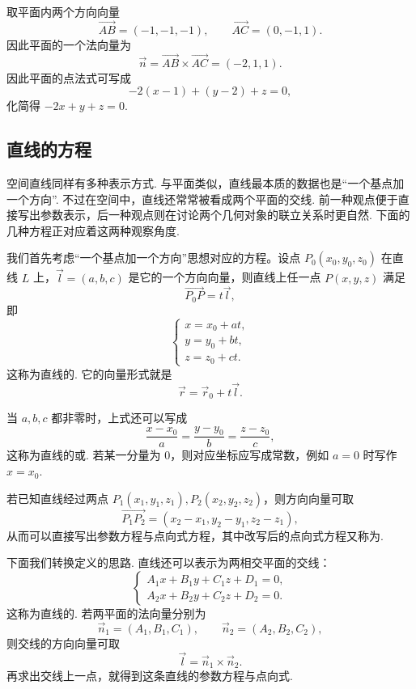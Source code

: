 \begin{solution}
    取平面内两个方向向量
    \[
        \overrightarrow{AB} = (-1, -1, -1), \qquad \overrightarrow{AC} = (0, -1, 1).
    \]
    因此平面的一个法向量为
    \[
        \vec{n} = \overrightarrow{AB}\times\overrightarrow{AC} = (-2, 1, 1).
    \]
    因此平面的点法式可写成
    \[
        -2(x - 1) + (y - 2) + z = 0,
    \]
    化简得 $-2x + y + z = 0$.
\end{solution}

\subsection{直线的方程}

空间直线同样有多种表示方式. 与平面类似，直线最本质的数据也是``一个基点加一个方向''. 不过在空间中，直线还常常被看成两个平面的交线. 前一种观点便于直接写出参数表示，后一种观点则在讨论两个几何对象的联立关系时更自然. 下面的几种方程正对应着这两种观察角度.

我们首先考虑``一个基点加一个方向''思想对应的方程。设点 $P_0(x_0, y_0, z_0)$ 在直线 $L$ 上，$\vec{l} = (a, b, c)$ 是它的一个方向向量，则直线上任一点 $P(x, y, z)$ 满足
\[
    \overrightarrow{P_0P} = t \vec{l},
\]
即
\[
    \begin{cases}
        x = x_0 + a t, \\
        y = y_0 + b t, \\
        z = z_0 + c t.
    \end{cases}
\]
这称为直线的. 它的向量形式就是
\[
    \vec{r} = \vec{r}_0 + t \vec{l}.
\]

当 $a, b, c$ 都非零时，上式还可以写成
\[
    \frac{x - x_0}{a} = \frac{y - y_0}{b} = \frac{z - z_0}{c},
\]
这称为直线的或. 若某一分量为 $0$，则对应坐标应写成常数，例如 $a = 0$ 时写作 $x = x_0$.

若已知直线经过两点 $P_1(x_1, y_1, z_1), P_2(x_2, y_2, z_2)$，则方向向量可取
\[
    \overrightarrow{P_1P_2} = (x_2 - x_1, y_2 - y_1, z_2 - z_1),
\]
从而可以直接写出参数方程与点向式方程，其中改写后的点向式方程又称为.

下面我们转换定义的思路. 直线还可以表示为两相交平面的交线：
\[
    \begin{cases}
        A_1 x + B_1 y + C_1 z + D_1 = 0, \\
        A_2 x + B_2 y + C_2 z + D_2 = 0.
    \end{cases}
\]
这称为直线的. 若两平面的法向量分别为
\[
    \vec{n}_1 = (A_1, B_1, C_1), \qquad \vec{n}_2 = (A_2, B_2, C_2),
\]
则交线的方向向量可取
\[
    \vec{l} = \vec{n}_1 \times \vec{n}_2.
\]
再求出交线上一点，就得到这条直线的参数方程与点向式.

